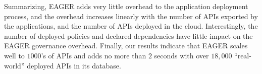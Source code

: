 Summarizing, 
EAGER adds very little overhead to the application deployment process, and the
overhead increases linearly with the number of APIs exported by the applications, and the number of APIs deployed in the cloud. 
Interestingly, the number of deployed policies and declared dependencies
have little impact on the EAGER governance overhead. Finally, our results indicate that EAGER scales
well to $1000$'s of APIs and adds no more than $2$ seconds with over
$18,000$ ``real-world''
deployed APIs in its database.
